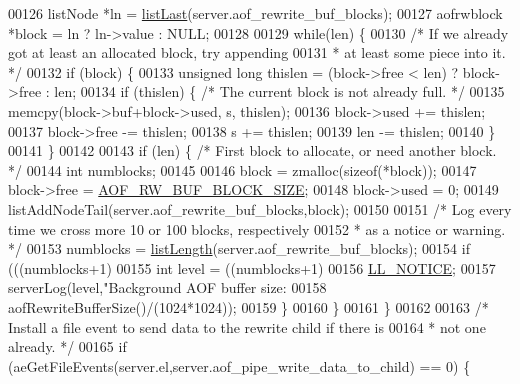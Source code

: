 \begin{DoxyCode}
00126     listNode *ln = \hyperlink{adlist_8h_a5e0fad60032ef0fe9adcf9811e2f2fba}{listLast}(server.aof\_rewrite\_buf\_blocks);
00127     aofrwblock *block = ln ? ln->value : NULL;
00128 
00129     \textcolor{keywordflow}{while}(len) \{
00130         \textcolor{comment}{/* If we already got at least an allocated block, try appending}
00131 \textcolor{comment}{         * at least some piece into it. */}
00132         \textcolor{keywordflow}{if} (block) \{
00133             \textcolor{keywordtype}{unsigned} \textcolor{keywordtype}{long} thislen = (block->free < len) ? block->free : len;
00134             \textcolor{keywordflow}{if} (thislen) \{  \textcolor{comment}{/* The current block is not already full. */}
00135                 memcpy(block->buf+block->used, s, thislen);
00136                 block->used += thislen;
00137                 block->free -= thislen;
00138                 s += thislen;
00139                 len -= thislen;
00140             \}
00141         \}
00142 
00143         \textcolor{keywordflow}{if} (len) \{ \textcolor{comment}{/* First block to allocate, or need another block. */}
00144             \textcolor{keywordtype}{int} numblocks;
00145 
00146             block = zmalloc(\textcolor{keyword}{sizeof}(*block));
00147             block->free = \hyperlink{aof_8c_a44139ff5d81f229e77d843b17ada505e}{AOF\_RW\_BUF\_BLOCK\_SIZE};
00148             block->used = 0;
00149             listAddNodeTail(server.aof\_rewrite\_buf\_blocks,block);
00150 
00151             \textcolor{comment}{/* Log every time we cross more 10 or 100 blocks, respectively}
00152 \textcolor{comment}{             * as a notice or warning. */}
00153             numblocks = \hyperlink{adlist_8h_afde0ab079f934670e82119b43120e94b}{listLength}(server.aof\_rewrite\_buf\_blocks);
00154             \textcolor{keywordflow}{if} (((numblocks+1) %
00155                 \textcolor{keywordtype}{int} level = ((numblocks+1) %
00156                                                          \hyperlink{server_8h_a8c54c191e436c7dd3012167212692401}{LL\_NOTICE};
00157                 serverLog(level,\textcolor{stringliteral}{"Background AOF buffer size: %
00158                     aofRewriteBufferSize()/(1024*1024));
00159             \}
00160         \}
00161     \}
00162 
00163     \textcolor{comment}{/* Install a file event to send data to the rewrite child if there is}
00164 \textcolor{comment}{     * not one already. */}
00165     \textcolor{keywordflow}{if} (aeGetFileEvents(server.el,server.aof\_pipe\_write\_data\_to\_child) == 0) \{
}
\end{DoxyCode}

